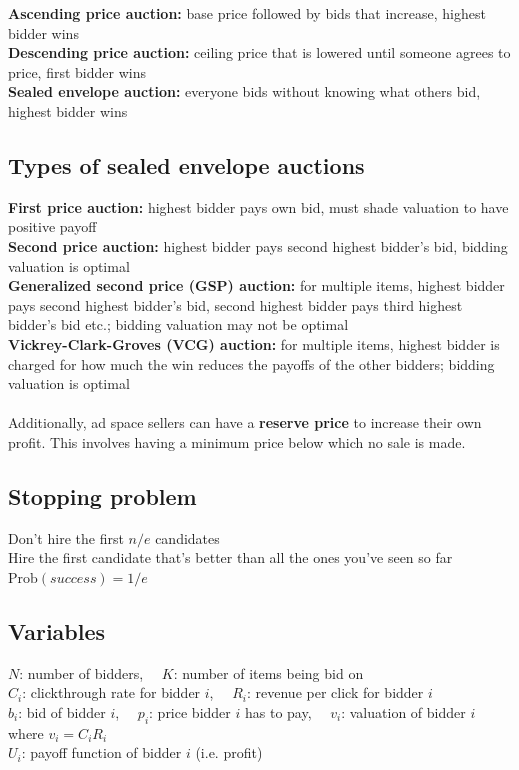 \documentclass{article}
\begin{document}
\textbf{Ascending price auction:} base price followed by bids that increase, highest bidder wins \\
\textbf{Descending price auction:} ceiling price that is lowered until someone agrees to price, first bidder wins \\
\textbf{Sealed envelope auction:} everyone bids without knowing what others bid, highest bidder wins \\

\subsection{Types of sealed envelope auctions}

\textbf{First price auction:} highest bidder pays own bid, must shade valuation to have positive payoff \\
\textbf{Second price auction:} highest bidder pays second highest bidder's bid, bidding valuation is optimal \\
\textbf{Generalized second price (GSP) auction:} for multiple items, highest bidder pays second highest bidder's bid, second highest bidder pays third highest bidder's bid etc.; bidding valuation may not be optimal \\
\textbf{Vickrey-Clark-Groves (VCG) auction:} for multiple items, highest bidder is charged for how much the win reduces the payoffs of the other bidders; bidding valuation is optimal \\
\\
Additionally, ad space sellers can have a \textbf{reserve price} to increase their own profit. This involves having a minimum price below which no sale is made. \\

\subsection{Stopping problem}
Don’t hire the first $n/e$ candidates \\
Hire the first candidate that's better than all the ones you've seen so far \\
$\text{Prob}(success) = 1/e$ \\

\subsection{Variables}

$N$: number of bidders, \ \ $K$: number of items being bid on \\
$C_i$: clickthrough rate for bidder $i$, \ \ $R_i$: revenue per click for bidder $i$ \\
$b_i$: bid of bidder $i$, \ \ $p_i$: price bidder $i$ has to pay, \ \  $v_i$: valuation of bidder $i$ where $v_i = C_iR_i$ \\
$U_i$: payoff function of bidder $i$ (i.e. profit) \\
\end{document}

